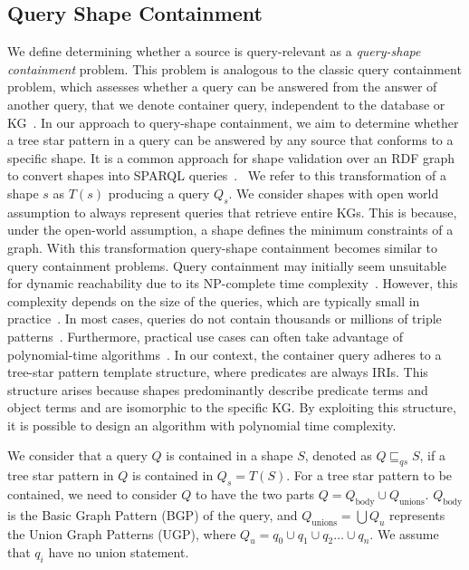 \subsection{Query Shape Containment}\label{sec:containment}
We define determining whether a source is query-relevant as a \emph{query-shape containment} problem.  
This problem is analogous to the classic query containment problem, which assesses whether a query can be answered from the answer of another query, that we denote container query, independent to the database or KG~\cite{afariQCE, Spasi2023}.
In our approach to query-shape containment, we aim to determine whether a tree star pattern in a query can be answered by any source that conforms to a specific shape.
It is a common approach for shape validation over an RDF graph to convert shapes into SPARQL queries~\cite{labragayo2017validatingdescribinglinkeddata, Corman2019,Prestamo2023, spapeExpressionConvert}.~
We refer to this transformation of a shape $s$ as $T(s)$ producing a query $Q_s$.
We consider shapes with open world assumption to always represent queries that retrieve entire KGs.
This is because, under the open-world assumption, a shape defines the minimum constraints of a graph.
With this transformation query-shape containment becomes similar to query containment problems.
Query containment may initially seem unsuitable for dynamic reachability due to its NP-complete time complexity~\cite{Spasi2023}.  
However, this complexity depends on the size of the queries, which are typically small in practice~\cite{Doan2012}.  
In most cases, queries do not contain thousands or millions of triple patterns~\cite{Bonifati2019}.  
Furthermore, practical use cases can often take advantage of polynomial-time algorithms~\cite{Doan2012}.
In our context, the container query adheres to a tree-star pattern template structure, where predicates are always IRIs.
This structure arises because shapes predominantly describe predicate terms and object terms and are isomorphic to the specific KG.
By exploiting this structure, it is possible to design an algorithm with polynomial time complexity.

We consider that a query $Q$ is contained in a shape $S$, denoted as $Q \sqsubseteq_{qs} S$, if a tree star pattern in $Q$ is contained in $Q_s = T(S)$. 
For a tree star pattern to be contained, we need to consider $Q$ to have the two parts $Q = Q_{\text{body}} \cup Q_{\text{unions}}$.
$Q_{\text{body}}$ is the Basic Graph Pattern (BGP) of the query, and $Q_{\text{unions}} = \bigcup Q_u$ represents the Union Graph Patterns (UGP), where $Q_u = q_0 \cup q_1 \cup q_2 \dots \cup q_n$.
We assume that $q_i$ have no union statement.

